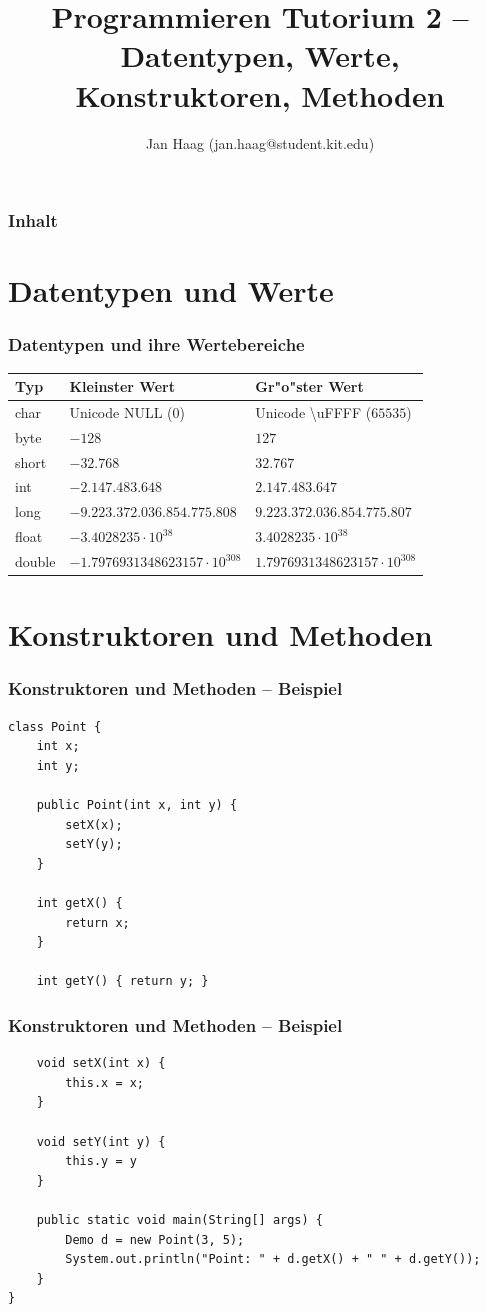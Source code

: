 \documentclass{beamer}
\author{Jan Haag (jan.haag@student.kit.edu)}
\title{Programmieren Tutorium 2 -- Datentypen, Werte, Konstruktoren, Methoden}
\institute{Institut f\"{u}r Zeritfizierbare und Vertrauensw\"{u}rdige Informatiksysteme (ZVI)}
\begin{document}
\begin{frame}
\maketitle
\end{frame}

\begin{frame}
\frametitle{Inhalt}
\tableofcontents
\end{frame}

\section{Datentypen und Werte}
\begin{frame}%
\frametitle{Datentypen und ihre Wertebereiche}
\begin{tabular}{lll}
Typ & Kleinster Wert & Gr"o"ster Wert\\
\hline
char & Unicode NULL ($0$) & Unicode \textbackslash{}uFFFF ($65 535$) \\
byte & $-128$ & $127$ \\
short & $-32.768$ & $32.767$ \\
int & $-2.147.483.648$ & $2.147.483.647$ \\
long & $-9.223.372.036.854.775.808$ & $9.223.372.036.854.775.807$\\
float & $-3.4028235\cdot{}10^{38}$ & $3.4028235\cdot{}10^{38}$\\
double & $-1.7976931348623157\cdot{}10^{308}$ & $1.7976931348623157\cdot{}10^{308}$\\
\end{tabular}
\end{frame}

\section{Konstruktoren und Methoden}
\begin{frame}[fragile]
\frametitle{Konstruktoren und Methoden -- Beispiel}
\begin{verbatim}
class Point {
    int x;
    int y;

    public Point(int x, int y) {
        setX(x);
        setY(y);
    }

    int getX() {
        return x;
    }

    int getY() { return y; }
\end{verbatim}
\end{frame}

\begin{frame}[fragile]
\frametitle{Konstruktoren und Methoden -- Beispiel}
\begin{verbatim}
    void setX(int x) {
        this.x = x;
    }

    void setY(int y) {
        this.y = y
    }

    public static void main(String[] args) {
        Demo d = new Point(3, 5);
        System.out.println("Point: " + d.getX() + " " + d.getY());
    }
}
\end{verbatim}
\end{frame}
\end{document}
